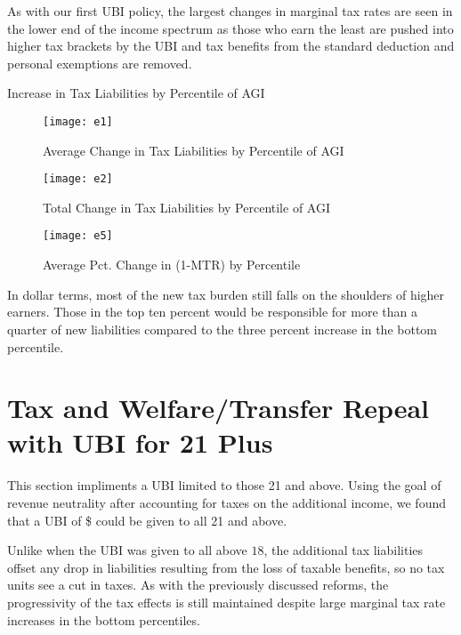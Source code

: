 \documentclass{article}
\begin{document}
As with our first UBI policy, the largest changes in marginal tax rates are seen in the lower end of the income spectrum as those who earn the least are pushed into higher tax brackets by the UBI and tax benefits from the standard deduction and personal exemptions are removed.

\begin{table}[H]
\caption{Increase in Tax Liabilities by Percentile of AGI}
\begin{center}
\begin{adjustbox}{max width=\textwidth}

\end{adjustbox}
\end{center}
\end{table}

\begin{figure}[H]
\centering
\caption{Average Change in Tax Liabilities by Percentile of AGI}
\texttt{[image: e1]}
\end{figure}

\begin{figure}[H]
\centering
\caption{Total Change in Tax Liabilities by Percentile of AGI}
\texttt{[image: e2]}
\end{figure}

\begin{figure}[H]
\centering
\caption{Average Pct. Change in (1-MTR) by Percentile}
\texttt{[image: e5]}
\end{figure}

In dollar terms, most of the new tax burden still falls on the shoulders of higher earners. Those in the top ten percent would be responsible for more than a quarter of new liabilities compared to the three percent increase in the bottom percentile.

\section{Tax and Welfare/Transfer Repeal with UBI for 21 Plus}
This section impliments a UBI limited to those 21 and above. Using the goal of revenue neutrality after accounting for taxes on the additional income, we found that a UBI of \$\fxaa{} could be given to all 21 and above.

Unlike when the UBI was given to all above $18$, the additional tax liabilities offset any drop in liabilities resulting from the loss of taxable benefits, so no tax units see a cut in taxes. As with the previously discussed reforms, the progressivity of the tax effects is still maintained despite large marginal tax rate increases in the bottom percentiles.
\end{document}
